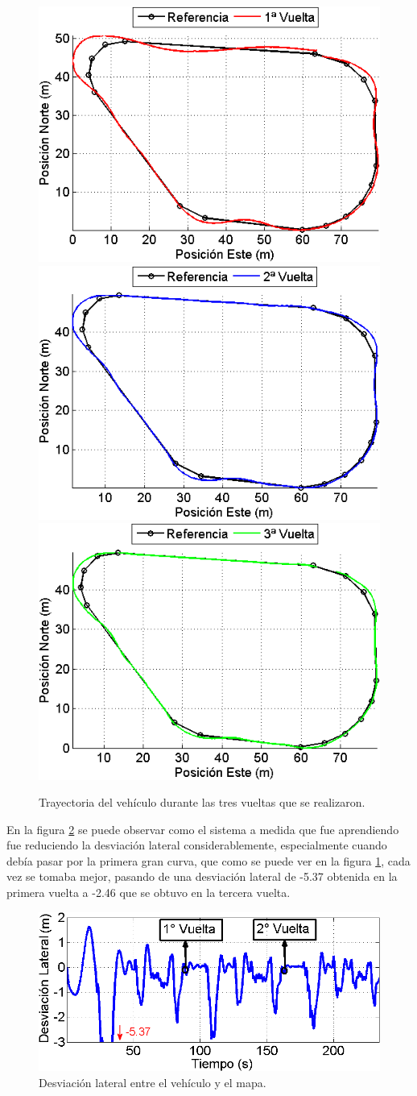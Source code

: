 \begin{figure}[htb]
\centering
\includegraphics[width=0.48\linewidth]{figures/vuelta1.png}\hspace{0.04\linewidth}\includegraphics[width=0.48\linewidth]{figures/vuelta2.png}
\includegraphics[width=0.5\linewidth]{figures/vuelta3.png}
\caption{Trayectoria del vehículo durante las tres vueltas que se realizaron.}
\label{fig:zocoV}
\end{figure}  

En la figura \ref{fig:desvPlatero} se puede observar como el sistema a medida que fue aprendiendo fue reduciendo la desviación lateral considerablemente, especialmente cuando debía pasar por la primera gran curva, que como se puede ver en la figura \ref{fig:zocoV}, cada vez se tomaba mejor, pasando de una desviación lateral de -5.37 obtenida en la primera vuelta a -2.46 que se obtuvo en la tercera vuelta.   

\begin{figure}[htb]
\centering
\includegraphics[width=0.8\linewidth]{figures/desviacionPlatero.png}
\caption{Desviación lateral entre el vehículo y el mapa.}
\label{fig:desvPlatero}
\end{figure}

